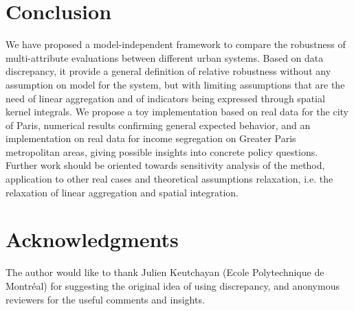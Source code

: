 \documentclass[runningheads,a4paper]{llncs2e/llncs}
\begin{document}
\section*{Conclusion}

We have proposed a model-independent framework to compare the robustness of multi-attribute evaluations between different urban systems. Based on data discrepancy, it provide a general definition of relative robustness without any assumption on model for the system, but with limiting assumptions that are the need of linear aggregation and of indicators being expressed through spatial kernel integrals. We propose a toy implementation based on real data for the city of Paris, numerical results confirming general expected behavior, and an implementation on real data for income segregation on Greater Paris metropolitan areas, giving possible insights into concrete policy questions. Further work should be oriented towards sensitivity analysis of the method, application to other real cases and theoretical assumptions relaxation, i.e. the relaxation of linear aggregation and spatial integration.


\section*{Acknowledgments}

The author would like to thank Julien Keutchayan (Ecole Polytechnique de Montr{\'e}al) for suggesting the original idea of using discrepancy, and anonymous reviewers for the useful comments and insights.






\end{document}
